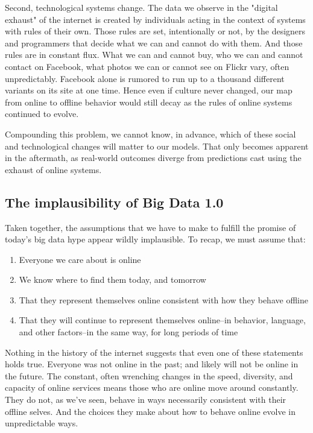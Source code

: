 \documentclass[12pt]{article}
\begin{document}
Second, technological systems change. The data we observe in the
"digital exhaust" of the internet is created by individuals acting in
the context of systems with rules of their own. Those rules are set,
intentionally or not, by the designers and programmers that decide
what we can and cannot do with them. And those rules are in constant
flux. What we can and cannot buy, who we can and cannot contact on
Facebook, what photos we can or cannot see on Flickr vary, often
unpredictably. Facebook alone is rumored to run up to a thousand
different variants on its site at one time. Hence even if culture
never changed, our map from online to offline behavior would still
decay as the rules of online systems continued to evolve.

Compounding this problem, we cannot know, in advance, which of these
social and technological changes will matter to our models. That only
becomes apparent in the aftermath, as real-world outcomes diverge from
predictions cast using the exhaust of online systems.


\subsection{The implausibility of Big Data 1.0}
\label{sec:impl-big-data}


Taken together, the assumptions that we have to make to fulfill the
promise of today's big data hype appear wildly implausible. To recap,
we must assume that:

\begin{enumerate}
\item Everyone we care about is online
\item We know where to find
  them today, and tomorrow
\item That they represent themselves online
  consistent with how they behave offline
\item That they will continue
  to represent themselves online--in behavior, language, and other
  factors--in the same way, for long periods of time
\end{enumerate}

Nothing in the history of the internet suggests that even one of
these statements holds true. Everyone was not online in the past; and
likely will not be online in the future. The constant, often
wrenching changes in the speed, diversity, and capacity of online
services means those who are online move around constantly. They do
not, as we've seen, behave in ways necessarily consistent with their
offline selves. And the choices they make about how to behave online
evolve in unpredictable ways. 
\end{document}
